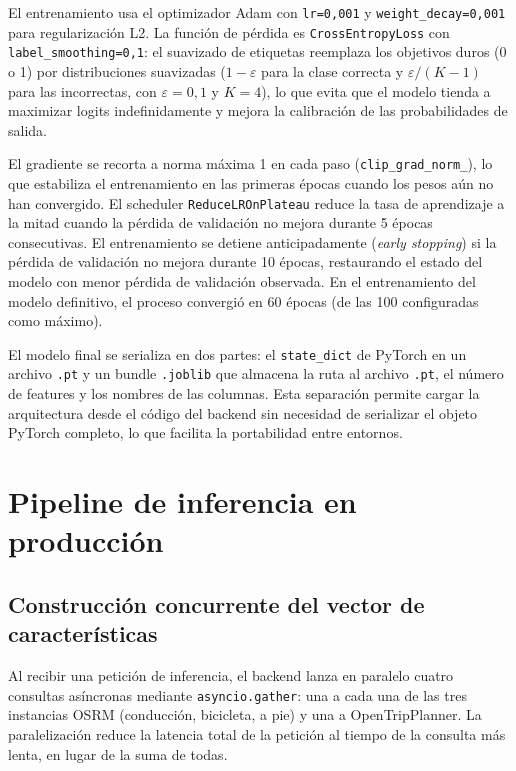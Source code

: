 El entrenamiento usa el optimizador Adam con \texttt{lr=0,001} y \texttt{weight\_decay=0,001} para regularización L2. La función de pérdida es \texttt{CrossEntropyLoss} con \texttt{label\_smoothing=0,1}: el suavizado de etiquetas reemplaza los objetivos duros (0 o 1) por distribuciones suavizadas ($1 - \varepsilon$ para la clase correcta y $\varepsilon / (K-1)$ para las incorrectas, con $\varepsilon = 0{,}1$ y $K = 4$), lo que evita que el modelo tienda a maximizar logits indefinidamente y mejora la calibración de las probabilidades de salida.

El gradiente se recorta a norma máxima 1 en cada paso (\texttt{clip\_grad\_norm\_}), lo que estabiliza el entrenamiento en las primeras épocas cuando los pesos aún no han convergido. El scheduler \texttt{ReduceLROnPlateau} reduce la tasa de aprendizaje a la mitad cuando la pérdida de validación no mejora durante 5 épocas consecutivas. El entrenamiento se detiene anticipadamente (\textit{early stopping}) si la pérdida de validación no mejora durante 10 épocas, restaurando el estado del modelo con menor pérdida de validación observada. En el entrenamiento del modelo definitivo, el proceso convergió en 60 épocas (de las 100 configuradas como máximo).

El modelo final se serializa en dos partes: el \texttt{state\_dict} de PyTorch en un archivo \texttt{.pt} y un bundle \texttt{.joblib} que almacena la ruta al archivo \texttt{.pt}, el número de features y los nombres de las columnas. Esta separación permite cargar la arquitectura desde el código del backend sin necesidad de serializar el objeto PyTorch completo, lo que facilita la portabilidad entre entornos.

\section{Pipeline de inferencia en producción}
\label{sec:impl_pipeline}

\subsection{Construcción concurrente del vector de características}

Al recibir una petición de inferencia, el backend lanza en paralelo cuatro consultas asíncronas mediante \texttt{asyncio.gather}: una a cada una de las tres instancias OSRM (conducción, bicicleta, a pie) y una a OpenTripPlanner. La paralelización reduce la latencia total de la petición al tiempo de la consulta más lenta, en lugar de la suma de todas.

